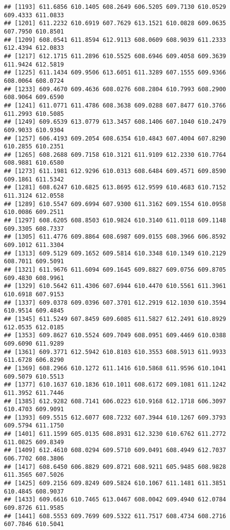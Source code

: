 \documentclass[
]{article}
\begin{document}
\begin{verbatim}
## [1193] 611.6856 610.1405 608.2649 606.5205 609.7130 610.0529 609.4333 611.0833
## [1201] 611.2232 610.6919 607.7629 613.1521 610.0828 609.0635 607.7950 610.8501
## [1209] 608.0541 611.8594 612.9113 608.0609 608.9039 611.2333 612.4394 612.0833
## [1217] 612.1715 611.2896 610.5525 608.6946 609.4058 609.3639 611.9424 612.5819
## [1225] 611.1434 609.9506 613.6051 611.3289 607.1555 609.9366 608.0064 608.0724
## [1233] 609.4670 609.4636 608.0276 608.2804 610.7993 608.2900 608.9064 609.6590
## [1241] 611.0771 611.4786 608.3638 609.0288 607.8477 610.3766 611.2993 610.5085
## [1249] 609.6539 613.0779 613.3457 608.1406 607.1040 610.2479 609.9033 610.9304
## [1257] 606.4193 609.2054 608.6354 610.4843 607.4004 607.8290 610.2855 610.2351
## [1265] 608.2688 609.7158 610.3121 611.9109 612.2330 610.7764 608.9881 610.6580
## [1273] 611.1981 612.9296 610.0313 608.6484 609.4571 609.8590 609.1861 611.5342
## [1281] 608.6247 610.6825 613.8695 612.9599 610.4683 610.7152 611.3124 612.0558
## [1289] 610.5547 609.6994 607.9300 611.3162 609.1554 610.0958 610.0086 609.2511
## [1297] 608.6205 608.8503 610.9824 610.3140 611.0118 609.1148 609.3305 608.7337
## [1305] 611.4776 609.8864 608.6987 609.0155 608.3966 606.8592 609.1012 611.3304
## [1313] 609.5129 609.1652 609.5814 610.3348 610.1349 610.2129 608.7011 609.5091
## [1321] 611.9676 611.6094 609.1645 609.8827 609.0756 609.8705 609.4830 608.9961
## [1329] 610.5642 611.4306 607.6944 610.4470 610.5561 611.3961 610.6918 607.9153
## [1337] 609.0378 609.0396 607.3701 612.2919 612.1030 610.3594 610.9514 609.4845
## [1345] 611.5249 607.8459 609.6085 611.5827 612.2491 610.8929 612.0535 612.0185
## [1353] 609.8627 610.5524 609.7049 608.0951 609.4469 610.0388 609.6090 611.9289
## [1361] 609.3771 612.5942 610.8103 610.3553 608.5913 611.9933 611.6728 606.8290
## [1369] 608.2966 610.1272 611.1416 610.5868 611.9596 610.1041 609.5079 610.5513
## [1377] 610.1637 610.1836 610.1011 608.6172 609.1081 611.1242 611.3952 611.7446
## [1385] 612.9282 608.7141 606.0223 610.9168 612.1718 606.3097 610.4703 609.9091
## [1393] 609.5515 612.6077 608.7232 607.3944 610.1267 609.3793 609.5794 611.1750
## [1401] 611.1599 605.0135 608.8931 612.3230 610.6762 611.2772 611.0825 609.8349
## [1409] 612.4610 608.0294 609.5710 609.0491 608.4949 612.7037 606.7702 608.3806
## [1417] 608.6450 606.8829 609.8721 608.9211 605.9485 608.9828 611.3565 607.5026
## [1425] 609.2156 609.8249 609.5824 610.1067 611.1481 611.3851 610.4845 608.9037
## [1433] 609.6616 610.7465 613.0467 608.0042 609.4940 612.0784 609.8726 611.9585
## [1441] 608.5553 609.7699 609.5322 611.7517 608.4734 608.2716 607.7846 610.5041

\end{verbatim}
\end{document}
